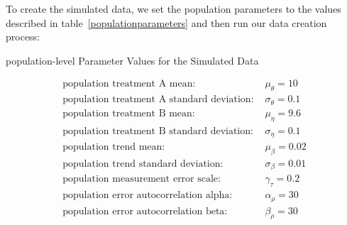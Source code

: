 \documentclass[12pt,a4paper,leqno]{report}
\theoremstyle{plain}
\theoremstyle{definition}
\theoremstyle{remark}
\begin{document}
\bigskip
{}
\bigskip

To create the simulated data, we set the population parameters to the values described
in table\ \ref{populationparameters} and then run
our data creation process:

\begin{table}[H]
    \caption{population-level Parameter Values for the Simulated Data}\label{populationparameters}
    \begin{align}\label{}
        \text{population treatment A mean: } & \mu_{\theta} = 10 \nonumber \\
        \text{population treatment A standard deviation: } & \sigma_{\theta} = 0.1 \nonumber \\
        \text{population treatment B mean: } & \mu_{\eta} = 9.6 \nonumber \\
        \text{population treatment B standard deviation: } & \sigma_{\eta} = 0.1 \nonumber \\
        \text{population trend mean: } & \mu_{\beta} = 0.02 \nonumber \\
        \text{population trend standard deviation: } & \sigma_{\beta} = 0.01 \nonumber \\
        \text{population measurement error scale: } & \gamma_{\tau} = 0.2 \nonumber \\
        \text{population error autocorrelation alpha: } & \alpha_{\rho} = 30 \nonumber \\
        \text{population error autocorrelation beta: } & \beta_{\rho} = 30 \nonumber
    \end{align}
\end{table}
\end{document}
